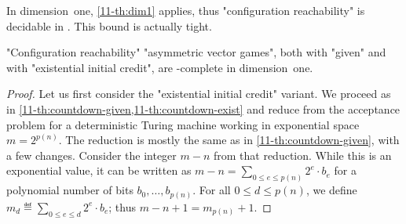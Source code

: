 In dimension~one, \cref{11-th:dim1} applies, thus "configuration
reachability" is decidable in \EXPSPACE.  This bound is actually
tight.
\begin{theorem}
\label{11-th:asym-dim1}
  "Configuration reachability" "asymmetric vector games", both with
  "given" and with "existential initial credit",
  are \EXPSPACE-complete in dimension~one.
\end{theorem}
\begin{proof}
  Let us first consider the "existential initial credit" variant.  We
  proceed as in \cref{11-th:countdown-given,11-th:countdown-exist} and
  reduce from the acceptance problem for a deterministic Turing
  machine working in exponential space $m=2^{p(n)}$.  The reduction is
  mostly the same as in \cref{11-th:countdown-given}, with a few changes.
  Consider the integer $m-n$ from that reduction.  While this is an
  exponential value, it can be written as $m-n=\sum_{0\leq e\leq
  p(n)}2^{e}\cdot b_e$ for a polynomial number of bits $b_0,\dots,b_{p(n)}$.
  For all $0\leq d\leq p(n)$, we define $m_d\eqdef \sum_{0\leq e\leq
  d}2^{e}\cdot b_e$; thus $m-n+1=m_{p(n)}+1$.


\end{proof}
